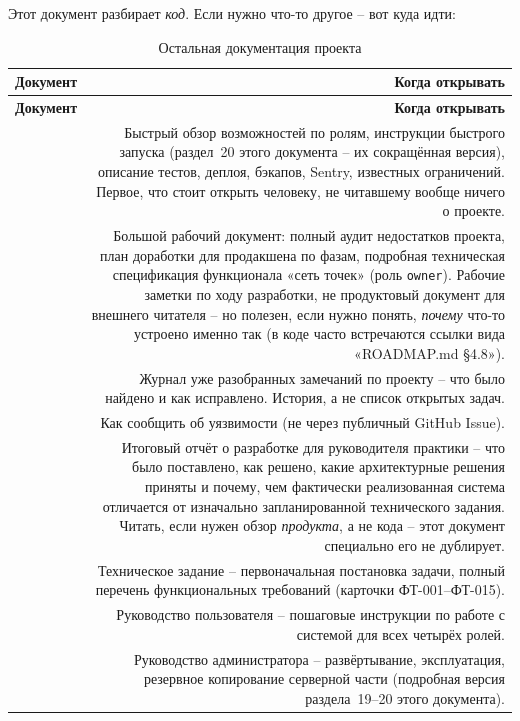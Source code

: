 Этот документ разбирает \emph{код}. Если нужно что-то другое -- вот куда
идти:

\begin{xltabular}{\textwidth}{M D}
\caption{Остальная документация проекта} \\
\hline
\textbf{Документ} & \textbf{Когда открывать} \\
\hline
\endfirsthead
\hline
\textbf{Документ} & \textbf{Когда открывать} \\
\hline
\endhead
\hline
\endfoot
{} & Быстрый обзор возможностей по ролям, инструкции
  быстрого запуска (раздел~20 этого документа -- их сокращённая версия),
  описание тестов, деплоя, бэкапов, Sentry, известных ограничений. Первое,
  что стоит открыть человеку, не читавшему вообще ничего о проекте. \\
 & Большой рабочий документ: полный аудит недостатков
  проекта, план доработки для продакшена по фазам, подробная техническая
  спецификация функционала «сеть точек» (роль \texttt{owner}). Рабочие
  заметки по ходу разработки, не продуктовый документ для внешнего
  читателя -- но полезен, если нужно понять, \emph{почему} что-то
  устроено именно так (в коде часто встречаются ссылки вида
  «ROADMAP.md §4.8»). \\
 & Журнал уже разобранных замечаний по проекту --
  что было найдено и как исправлено. История, а не список открытых задач. \\
 & Как сообщить об уязвимости (не через публичный
  GitHub Issue). \\
 & Итоговый отчёт о разработке для
  руководителя практики -- что было поставлено, как решено, какие
  архитектурные решения приняты и почему, чем фактически реализованная
  система отличается от изначально запланированной технического задания.
  Читать, если нужен обзор \emph{продукта}, а не кода -- этот документ
  специально его не дублирует. \\
 & Техническое задание -- первоначальная
  постановка задачи, полный перечень функциональных требований
  (карточки ФТ-001--ФТ-015). \\
 & Руководство пользователя -- пошаговые
  инструкции по работе с системой для всех четырёх ролей. \\
 & Руководство администратора --
  развёртывание, эксплуатация, резервное копирование серверной части
  (подробная версия раздела~19--20 этого документа). \\

\end{xltabular}
